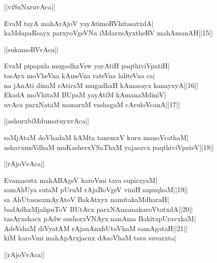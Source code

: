 \documentclass{article}
\begin{document}
\begin{center}
||viSuNxruvAca||
\end{center}

EvaM tayA mahArAjoV yayAtimoRVhitasatxdA|\\
kaMdapaRsayx parxyoVgeVNa iMdarxsAyxtheRV mahAmanAH||15||\\

\begin{center}
||sukamoRVvAca||
\end{center}

EvaM pipapxla mugodhxVsw yayAtiH paqthiviVpatiH|\\
tasAyx moVheVna kAmeVna rateVna laliteVna ca|\\
na jAnAti dinaM rAtirxM mugadhxH kAmasayx kanayxyA||16||\\
EkadA moVhitaM BUpaM yayAtiM kAmanaMdiniV|\\
uvAca parxNataM namarxM vashagaM cAruloVcanA||17||\\

\begin{center}
||ashurxbiMdumatuyxvAca||
\end{center}

saMjAtaM doVhadaM kAMta tanemxV kuru manoVrathaM|\\
ashavxmeVdhaM muKasherxVSaThxM yajasavx paqthiviVpateV||18||\\

\begin{center}
||rAjoVvAca||
\end{center}

Evamasutx mahABAgeV karoVmi tava supirxyaM|\\
samAhUya sutaM pUruM rAjaBoVgeV viniH sapxqhaM||19||\\
sa AhUtasasxmAyAtoV BakAtxyx namitakaMdharaH|\\
badAdhxMjalipuToV BUtAvx parxNAmamakaroVtatxdA||20||\\
tasAyxshacx pAdw sushorxVNAyx nanAma BakitxpUravxkaM|\\
AdeVshaM diVyatAM rAjanAnxhUtoVhaM samAgataH||21||\\
kiM karoVmi mahApArxjacnx dAsoVhaM tava suvarxta|\\

\begin{center}
||rAjoVvAca||
\end{center}
\end{document}
